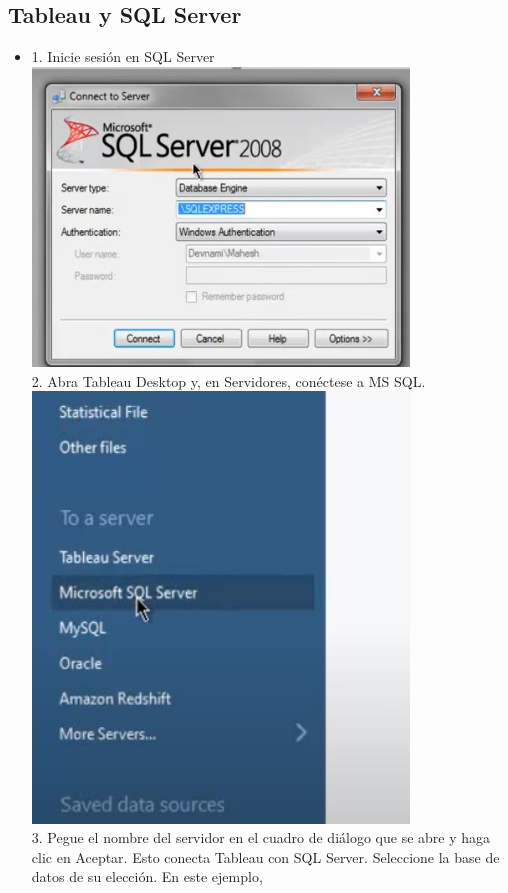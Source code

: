 \documentclass[preprint,12pt]{elsarticle}
\begin{document}
		\subsection{Tableau y SQL Server}
			\begin{itemize}
				\item 
				1. Inicie sesión en SQL Server
					\\	\includegraphics[width=10cm]{./IMAGENES/10.1}
				\\ 2. Abra Tableau Desktop y, en Servidores, conéctese a MS SQL.
					\\	\includegraphics[width=10cm]{./IMAGENES/10.2}
				\\ 3. Pegue el nombre del servidor en el cuadro de diálogo que se abre y haga clic en Aceptar. Esto
				conecta Tableau con SQL Server. Seleccione la base de datos de su elección. En este ejemplo,

\end{itemize}
\end{document}
